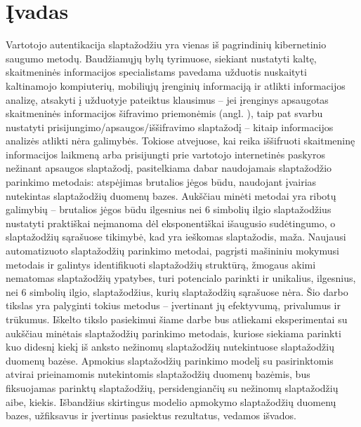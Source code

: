 \documentclass{VUMIFInfBakalaurinis}
\begin{document}
\section{Įvadas}
Vartotojo autentikacija slaptažodžiu yra vienas iš pagrindinių kibernetinio 
saugumo metodų.
Baudžiamųjų bylų tyrimuose, siekiant nustatyti kaltę, skaitmeninės informacijos 
specialistams pavedama užduotis nuskaityti kaltinamojo kompiuterių, mobiliųjų 
įrenginių informaciją ir atlikti informacijos analizę, atsakyti į užduotyje 
pateiktus klausimus -- jei įrenginys apsaugotas skaitmeninės informacijos 
šifravimo priemonėmis (angl. ), taip pat svarbu 
nustatyti prisijungimo/apsaugos/iššifravimo slaptažodį -- kitaip informacijos 
analizės atlikti nėra galimybės.
Tokiose atvejuose, kai reika iššifruoti skaitmeninę informacijos laikmeną arba 
prisijungti prie vartotojo internetinės paskyros nežinant apsaugos slaptažodį, 
pasitelkiama dabar naudojamais slaptažodžio parinkimo metodais: atspėjimas 
brutalios jėgos būdu, naudojant įvairias nutekintas slaptažodžių duomenų bazes. 
Aukščiau minėti metodai yra ribotų galimybių -- brutalios jėgos būdu ilgesnius 
nei 6 simbolių ilgio slaptažodžius nustatyti praktiškai neįmanoma dėl 
eksponentiškai išaugusio sudėtingumo, o slaptažodžių sąrašuose tikimybė, kad yra 
ieškomas slaptažodis, maža.
Naujausi automatizuoto slaptažodžių parinkimo metodai, pagrįsti mašininiu 
mokymusi metodais ir galintys identifikuoti slaptažodžių struktūrą, žmogaus 
akimi nematomas slaptažodžių ypatybes, turi potencialo parinkti ir unikalius, 
ilgesnius, nei 6 simbolių ilgio, slaptažodžius, kurių slaptažodžių sąrašuose 
nėra. Šio darbo tikslas yra palyginti tokius metodus -- įvertinant jų 
efektyvumą, privalumus ir trūkumus.
Iškelto tikslo pasiekimui šiame darbe bus atliekami eksperimentai su aukščiau 
minėtais slaptažodžių parinkimo metodais, kuriose siekiama parinkti kuo didesnį 
kiekį iš anksto nežinomų slaptažodžių nutekintuose slaptažodžių duomenų bazėse. 
Apmokius slaptažodžių parinkimo modelį su pasirinktomis atvirai prieinamomis 
nutekintomis slaptažodžių duomenų bazėmis, bus fiksuojamas parinktų 
slaptažodžių, persidengiančių su nežinomų slaptažodžių aibe, kiekis. Išbandžius 
skirtingus modelio apmokymo slaptažodžių duomenų bazes, užfiksavus ir įvertinus 
pasiektus rezultatus, vedamos išvados.
\end{document}
